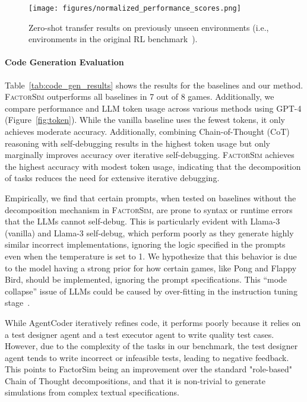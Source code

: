 \documentclass{article}
\theoremstyle{plain}
\theoremstyle{definition}
\theoremstyle{remark}
\newcommand{\method}{\textsc{FactorSim}\xspace}
\begin{document}
\begin{figure}[!t]
  \centering
  \texttt{[image: figures/normalized\_performance\_scores.png]}
   \caption{Zero-shot transfer results on previously unseen environments (i.e., environments in the original RL benchmark~\cite{tasfi2016PLE}).}
   \label{fig:zero_shot_transfer}
\end{figure}


\paragraph{Code Generation Evaluation}
Table~\ref{tab:code_gen_results} shows the results for the baselines and our method. \method outperforms all baselines in 7 out of 8 games. Additionally, we compare performance and LLM token usage across various methods using GPT-4 (Figure~\ref{fig:token}). While the vanilla baseline uses the fewest tokens, it only achieves moderate accuracy. Additionally, combining Chain-of-Thought (CoT) reasoning with self-debugging results in the highest token usage but only marginally improves accuracy over iterative self-debugging. 
\method achieves the highest accuracy with modest token usage, indicating that the decomposition of tasks reduces the need for extensive iterative debugging.

Empirically, we find that certain prompts, when tested on baselines without the decomposition mechanism in \method, are prone to syntax or runtime errors that the LLMs cannot self-debug. This is particularly evident with Llama-3 (vanilla) and Llama-3 self-debug, which perform poorly as they
generate highly similar incorrect implementations, ignoring the logic specified in the prompts even when the temperature is set to 1. We hypothesize that this behavior is due to the model having a strong prior for how certain games, like Pong and Flappy Bird, should be implemented, ignoring the prompt specifications. This ``mode collapse'' issue of LLMs could be caused by over-fitting in the instruction tuning stage~\cite{hamilton2024detecting}.

While AgentCoder iteratively refines code, it performs poorly because it relies on a test designer agent and a test executor agent to write quality test cases. However, due to the complexity of the tasks in our benchmark, the test designer agent tends to write incorrect or infeasible tests, leading to negative feedback. This points to FactorSim being an improvement over the standard "role-based" Chain of Thought decompositions, and that it is non-trivial to generate simulations from complex textual specifications.
\end{document}
